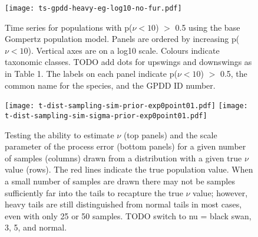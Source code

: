 \documentclass[11pt]{article}
\begin{document}
\begin{figure}[htbp]
\begin{center}
\texttt{[image: ts-gpdd-heavy-eg-log10-no-fur.pdf]}
\caption{Time series for populations with p($\nu < 10$) $>$ 0.5 using the base Gompertz population model. Panels are ordered by increasing p($\nu < 10$). Vertical axes are on a log10 scale. Colours indicate taxonomic classes. TODO add dots for upswings and downswings as in Table 1. The labels on each panel indicate p($\nu < 10$) $>$ 0.5, the common name for the species, and the GPDD ID number.}
\label{fig:heavy-ts}
\end{center}
\end{figure}

\begin{figure}[htbp]
\begin{center}
\texttt{[image: t-dist-sampling-sim-prior-exp0point01.pdf]}
\texttt{[image: t-dist-sampling-sim-sigma-prior-exp0point01.pdf]}
\caption{
  Testing the ability to estimate $\nu$ (top panels) and the scale parameter of the process error (bottom panels) for a given number of samples (columns) drawn from a distribution with a given true $\nu$ value (rows). The red lines indicate the true population value. When a small number of samples are drawn there may not be samples sufficiently far into the tails to recapture the true $\nu$ value; however, heavy tails are still distinguished from normal tails in most cases, even with only 25 or 50 samples. TODO switch to nu = black swan, 3, 5, and normal.
}
\label{fig:sim-nu}
\end{center}
\end{figure}

\clearpage
\end{document}
